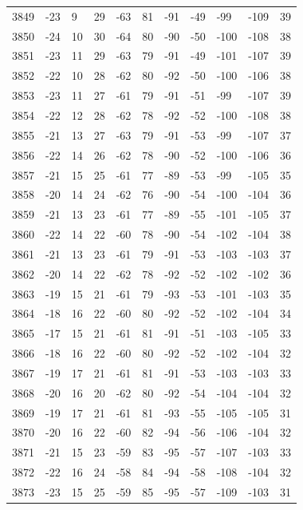 \begin{table}[H]
\begin{tabular}{lllllllllll}
3849 & -23 & 9 & 29 & -63 & 81 & -91 & -49 & -99 & -109 & 39 \\
3850 & -24 & 10 & 30 & -64 & 80 & -90 & -50 & -100 & -108 & 38 \\
3851 & -23 & 11 & 29 & -63 & 79 & -91 & -49 & -101 & -107 & 39 \\
3852 & -22 & 10 & 28 & -62 & 80 & -92 & -50 & -100 & -106 & 38 \\
3853 & -23 & 11 & 27 & -61 & 79 & -91 & -51 & -99 & -107 & 39 \\
3854 & -22 & 12 & 28 & -62 & 78 & -92 & -52 & -100 & -108 & 38 \\
3855 & -21 & 13 & 27 & -63 & 79 & -91 & -53 & -99 & -107 & 37 \\
3856 & -22 & 14 & 26 & -62 & 78 & -90 & -52 & -100 & -106 & 36 \\
3857 & -21 & 15 & 25 & -61 & 77 & -89 & -53 & -99 & -105 & 35 \\
3858 & -20 & 14 & 24 & -62 & 76 & -90 & -54 & -100 & -104 & 36 \\
3859 & -21 & 13 & 23 & -61 & 77 & -89 & -55 & -101 & -105 & 37 \\
3860 & -22 & 14 & 22 & -60 & 78 & -90 & -54 & -102 & -104 & 38 \\
3861 & -21 & 13 & 23 & -61 & 79 & -91 & -53 & -103 & -103 & 37 \\
3862 & -20 & 14 & 22 & -62 & 78 & -92 & -52 & -102 & -102 & 36 \\
3863 & -19 & 15 & 21 & -61 & 79 & -93 & -53 & -101 & -103 & 35 \\
3864 & -18 & 16 & 22 & -60 & 80 & -92 & -52 & -102 & -104 & 34 \\
3865 & -17 & 15 & 21 & -61 & 81 & -91 & -51 & -103 & -105 & 33 \\
3866 & -18 & 16 & 22 & -60 & 80 & -92 & -52 & -102 & -104 & 32 \\
3867 & -19 & 17 & 21 & -61 & 81 & -91 & -53 & -103 & -103 & 33 \\
3868 & -20 & 16 & 20 & -62 & 80 & -92 & -54 & -104 & -104 & 32 \\
3869 & -19 & 17 & 21 & -61 & 81 & -93 & -55 & -105 & -105 & 31 \\
3870 & -20 & 16 & 22 & -60 & 82 & -94 & -56 & -106 & -104 & 32 \\
3871 & -21 & 15 & 23 & -59 & 83 & -95 & -57 & -107 & -103 & 33 \\
3872 & -22 & 16 & 24 & -58 & 84 & -94 & -58 & -108 & -104 & 32 \\
3873 & -23 & 15 & 25 & -59 & 85 & -95 & -57 & -109 & -103 & 31 \\

\end{tabular}
\end{table}
